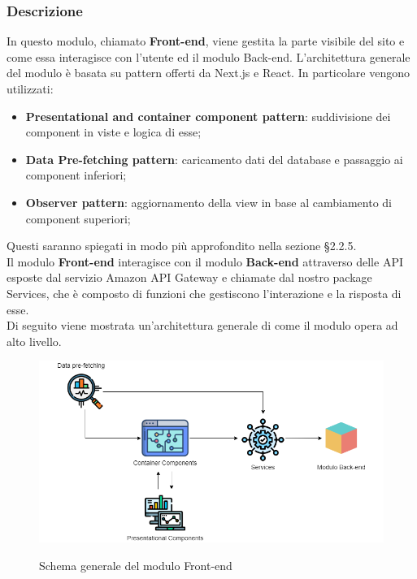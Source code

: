 \subsubsection{Descrizione}

In questo modulo, chiamato \textbf{Front-end}, viene gestita la parte visibile del sito \nameproject{} e come essa interagisce con l'utente ed il modulo Back-end. L'architettura generale del modulo è basata su pattern offerti da Next.js e React. In particolare vengono utilizzati:
\begin{itemize}
	\item \textbf{Presentational and container component pattern}: suddivisione dei component in viste e logica di esse;
	\item \textbf{Data Pre-fetching pattern}: caricamento dati del database e passaggio ai component inferiori;
	\item \textbf{Observer pattern}: aggiornamento della view in base al cambiamento di component superiori;
\end{itemize} 
Questi saranno spiegati in modo più approfondito nella sezione \S{2.2.5}.\\
Il modulo \textbf{Front-end} interagisce con il modulo \textbf{Back-end} attraverso delle API esposte dal servizio Amazon API Gateway e chiamate dal nostro package Services, che è composto di funzioni che gestiscono l'interazione e la risposta di esse. \\
Di seguito viene mostrata un'architettura generale di come il modulo opera ad alto livello.

\vspace{1cm}

\begin{figure}[H]
\centering
\includegraphics[scale=0.50]{res/Architettura/Frontend/img/general_frontend}\\
\caption{Schema generale del modulo Front-end}
\end{figure}